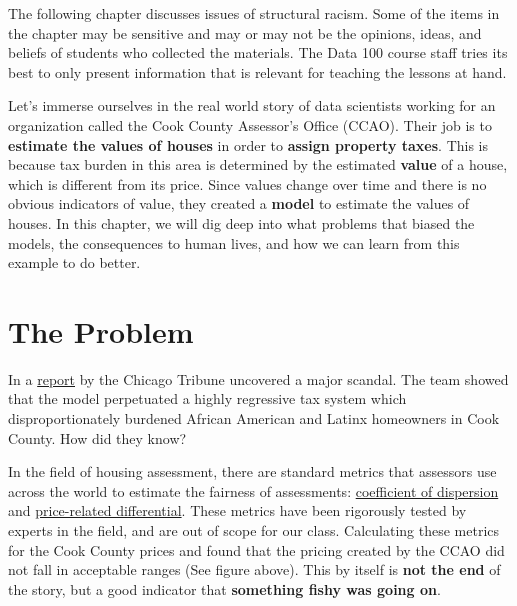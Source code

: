 \documentclass[
  letterpaper,
  DIV=11,
  numbers=noendperiod]{scrreprt}
\begin{document}
\begin{tcolorbox}[enhanced jigsaw, breakable, colbacktitle=quarto-callout-color!10!white, colback=white, opacitybacktitle=0.6, opacityback=0, bottomrule=.15mm, titlerule=0mm, toptitle=1mm, bottomtitle=1mm, left=2mm, colframe=quarto-callout-color-frame, title={DISCLAIMER}, rightrule=.15mm, toprule=.15mm, leftrule=.75mm, arc=.35mm, coltitle=black]

The following chapter discusses issues of structural racism. Some of the
items in the chapter may be sensitive and may or may not be the
opinions, ideas, and beliefs of students who collected the materials.
The Data 100 course staff tries its best to only present information
that is relevant for teaching the lessons at hand.

\end{tcolorbox}

Let's immerse ourselves in the real world story of data scientists
working for an organization called the Cook County Assessor's Office
(CCAO). Their job is to \textbf{estimate the values of houses} in order
to \textbf{assign property taxes}. This is because tax burden in this
area is determined by the estimated \textbf{value} of a house, which is
different from its price. Since values change over time and there is no
obvious indicators of value, they created a \textbf{model} to estimate
the values of houses. In this chapter, we will dig deep into what
problems that biased the models, the consequences to human lives, and
how we can learn from this example to do better.

\hypertarget{the-problem}{%
\section{The Problem}\label{the-problem}}

In a
\href{https://apps.chicagotribune.com/news/watchdog/cook-county-property-tax-divide/assessments.html}{report}
by the Chicago Tribune uncovered a major scandal. The team showed that
the model perpetuated a highly regressive tax system which
disproportionately burdened African American and Latinx homeowners in
Cook County. How did they know?

In the field of housing assessment, there are standard metrics that
assessors use across the world to estimate the fairness of assessments:
\href{https://www.realestateagent.com/real-estate-glossary/real-estate/coefficient-of-dispersion.html}{coefficient
of dispersion} and
\href{https://leg.wa.gov/House/Committees/FIN/Documents/2009/RatioText.pdf}{price-related
differential}. These metrics have been rigorously tested by experts in
the field, and are out of scope for our class. Calculating these metrics
for the Cook County prices and found that the pricing created by the
CCAO did not fall in acceptable ranges (See figure above). This by
itself is \textbf{not the end} of the story, but a good indicator that
\textbf{something fishy was going on}.
\end{document}
